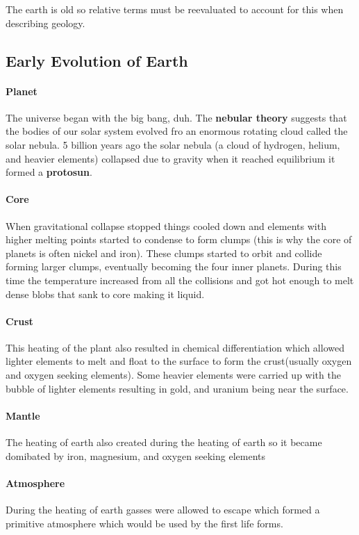 \documentclass{article}
\begin{document}
The earth is old so relative terms must be reevaluated to account for this when describing geology.

\subsection*{Early Evolution of Earth} %
\label{sub:early_evolution_of_earth}
 \paragraph{Planet}The universe began with the big bang, duh. The \textbf{nebular theory} suggests that the bodies of our solar system evolved fro an enormous rotating cloud called the solar nebula. 5 billion years ago the solar nebula (a cloud of hydrogen, helium, and heavier elements) collapsed due to gravity when it reached equilibrium it formed a \textbf{protosun}.

 \paragraph{Core} When gravitational collapse stopped things cooled down and elements with higher melting points started to condense to form clumps (this is why the core of planets is often nickel and iron). These clumps started to orbit and collide forming larger clumps, eventually becoming the four inner planets. During this time the temperature increased from all the collisions and got hot enough to melt dense blobs that sank to core making it liquid.

 \paragraph{Crust} This heating of the plant also resulted in chemical differentiation which allowed lighter elements to melt and float to the surface to form the crust(usually oxygen and oxygen seeking elements). Some heavier elements were carried up with the bubble of lighter elements resulting in gold, and uranium being near the surface.

\paragraph{Mantle} The heating of earth also created during the heating of earth so it became domibated by iron, magnesium, and oxygen seeking elements

\paragraph{Atmosphere} During the heating of earth gasses were allowed to escape which formed a primitive atmosphere which would be used by the first life forms.
\end{document}
